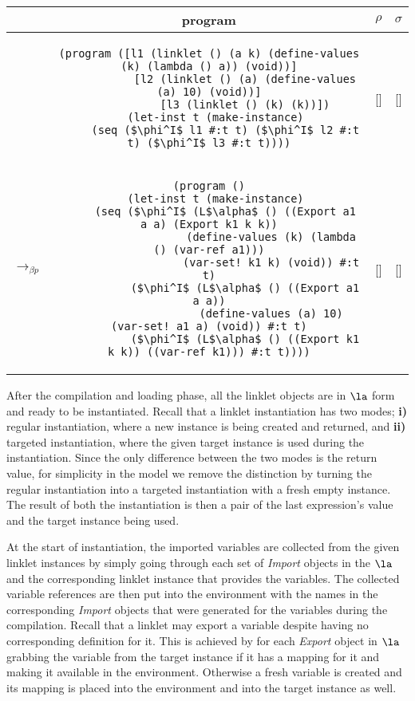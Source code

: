 \begin{table}[h!]
  \vspace{1cm}
  \centering
  \footnotesize
  \begin{tabular}{lc|c|c}
    &\textbf{program} & \textbf{$\rho$} & \textbf{$\sigma$} \\ \hline \hline
    &\begin{lstlisting}[mathescape]
(program ([l1 (linklet () (a k) (define-values (k) (lambda () a)) (void))]
           [l2 (linklet () (a) (define-values (a) 10) (void))]
           [l3 (linklet () (k) (k))])
  (let-inst t (make-instance)
     (seq ($\phi^I$ l1 #:t t) ($\phi^I$ l2 #:t t) ($\phi^I$ l3 #:t t))))
    \end{lstlisting} & [] & [] \\ \hline
    $\longrightarrow_{\beta p}$&\begin{lstlisting}[mathescape]
(program ()
  (let-inst t (make-instance)
     (seq ($\phi^I$ (L$\alpha$ () ((Export a1 a a) (Export k1 k k))
                   (define-values (k) (lambda () (var-ref a1)))
                   (var-set! k1 k) (void)) #:t t)
           ($\phi^I$ (L$\alpha$ () ((Export a1 a a))
                   (define-values (a) 10) (var-set! a1 a) (void)) #:t t)
           ($\phi^I$ (L$\alpha$ () ((Export k1 k k)) ((var-ref k1))) #:t t))))
    \end{lstlisting} & [] & [] \\ \hline
  \end{tabular}
\end{table}

After the compilation and loading phase, all the linklet objects are
in $\la$ form and ready to be instantiated. Recall that a linklet
instantiation has two modes; \textbf{i)} regular instantiation, where
a new instance is being created and returned, and \textbf{ii)}
targeted instantiation, where the given target instance is used during
the instantiation. Since the only difference between the two modes is
the return value, for simplicity in the model we remove the
distinction by turning the regular instantiation into a targeted
instantiation with a fresh empty instance. The result of both the
instantiation is then a pair of the last expression's value and the
target instance being used.

At the start of instantiation, the imported variables are collected
from the given linklet instances by simply going through each set of
\emph{Import} objects in the $\la$ and the corresponding linklet
instance that provides the variables. The collected variable
references are then put into the environment with the names in the
corresponding \emph{Import} objects that were generated for the
variables during the compilation. Recall that a linklet may export a
variable despite having no corresponding definition for it. This is
achieved by for each \emph{Export} object in $\la$ grabbing the
variable from the target instance if it has a mapping for it and
making it available in the environment. Otherwise a fresh variable is
created and its mapping is placed into the environment and into the
target instance as well.

